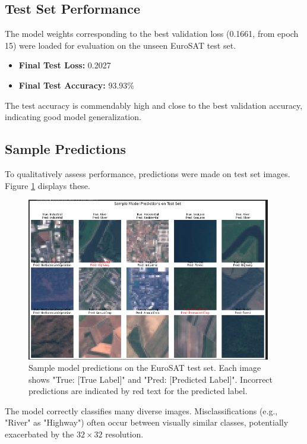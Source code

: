 \documentclass[11pt, a4paper]{article}
\begin{document}
\subsection{Test Set Performance}
The model weights corresponding to the best validation loss (0.1661, from epoch 15) were loaded for evaluation on the unseen EuroSAT test set.
\begin{itemize}[itemsep=0.3em]
    \item \textbf{Final Test Loss:} 0.2027
    \item \textbf{Final Test Accuracy:} 93.93\%
\end{itemize}
The test accuracy is commendably high and close to the best validation accuracy, indicating good model generalization.

\subsection{Sample Predictions}
To qualitatively assess performance, predictions were made on test set images. Figure \ref{fig:sample_predictions} displays these.

\begin{figure}[H]
    \centering
    \includegraphics[width=0.95\textwidth]{sample_model_predictions.png}
    \caption{Sample model predictions on the EuroSAT test set. Each image shows "True: [True Label]" and "Pred: [Predicted Label]". Incorrect predictions are indicated by red text for the predicted label.}
    \label{fig:sample_predictions}
\end{figure}
The model correctly classifies many diverse images. Misclassifications (e.g., "River" as "Highway") often occur between visually similar classes, potentially exacerbated by the $32 \times 32$ resolution.
\end{document}
